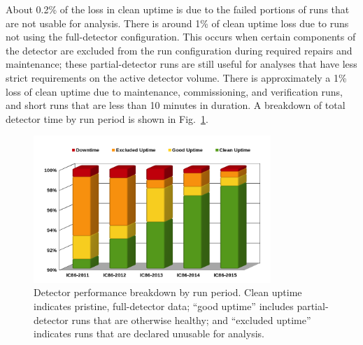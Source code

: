 About 0.2\% of the loss in clean uptime is due to the failed portions of
runs that are not usable for analysis.  There is around 1\% of clean
uptime loss due to runs not using the full-detector configuration. This
occurs when certain components of the detector are excluded from the run
configuration during required repairs and maintenance; these
partial-detector runs are still useful for analyses that have less strict
requirements on the active detector volume. There is approximately a 1\%
loss of clean uptime due to maintenance, commissioning, and verification
runs, and short runs that are less than 10 minutes in duration.  A
breakdown of total detector time by run period is shown in
Fig.~\ref{fig:period-performance}.  

\begin{figure}[!ht]
	\centering
    \includegraphics[width=0.8\textwidth]{graphics/uptime/bar-chart.png}
	\caption{Detector performance breakdown by
      run period.  Clean uptime indicates pristine, full-detector
      data; ``good uptime'' includes partial-detector runs that are
      otherwise healthy; and 
    ``excluded uptime'' indicates runs that are declared unusable for
      analysis.}
    \label{fig:period-performance}
\end{figure}


